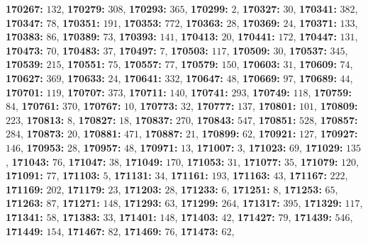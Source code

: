 \textsf{\bfseries 170267:} $132$, \textsf{\bfseries 170279:} $308$, \textsf{\bfseries 170293:} $365$, \textsf{\bfseries 170299:} $2$, \textsf{\bfseries 170327:} $30$, \textsf{\bfseries 170341:} $382$, \textsf{\bfseries 170347:} $78$, \textsf{\bfseries 170351:} $191$, \textsf{\bfseries 170353:} $772$, \textsf{\bfseries 170363:} $28$, \textsf{\bfseries 170369:} $24$, \textsf{\bfseries 170371:} $133$, \textsf{\bfseries 170383:} $86$, \textsf{\bfseries 170389:} $73$, \textsf{\bfseries 170393:} $141$, \textsf{\bfseries 170413:} $20$, \textsf{\bfseries 170441:} $172$, \textsf{\bfseries 170447:} $131$, \textsf{\bfseries 170473:} $70$, \textsf{\bfseries 170483:} $37$, \textsf{\bfseries 170497:} $7$, \textsf{\bfseries 170503:} $117$, \textsf{\bfseries 170509:} $30$, \textsf{\bfseries 170537:} $345$, \textsf{\bfseries 170539:} $215$, \textsf{\bfseries 170551:} $75$, \textsf{\bfseries 170557:} $77$, \textsf{\bfseries 170579:} $150$, \textsf{\bfseries 170603:} $31$, \textsf{\bfseries 170609:} $74$, \textsf{\bfseries 170627:} $369$, \textsf{\bfseries 170633:} $24$, \textsf{\bfseries 170641:} $332$, \textsf{\bfseries 170647:} $48$, \textsf{\bfseries 170669:} $97$, \textsf{\bfseries 170689:} $44$, \textsf{\bfseries 170701:} $119$, \textsf{\bfseries 170707:} $373$, \textsf{\bfseries 170711:} $140$, \textsf{\bfseries 170741:} $293$, \textsf{\bfseries 170749:} $118$, \textsf{\bfseries 170759:} $84$, \textsf{\bfseries 170761:} $370$, \textsf{\bfseries 170767:} $10$, \textsf{\bfseries 170773:} $32$, \textsf{\bfseries 170777:} $137$, \textsf{\bfseries 170801:} $101$, \textsf{\bfseries 170809:} $223$, \textsf{\bfseries 170813:} $8$, \textsf{\bfseries 170827:} $18$, \textsf{\bfseries 170837:} $270$, \textsf{\bfseries 170843:} $547$, \textsf{\bfseries 170851:} $528$, \textsf{\bfseries 170857:} $284$, \textsf{\bfseries 170873:} $20$, \textsf{\bfseries 170881:} $471$, \textsf{\bfseries 170887:} $21$, \textsf{\bfseries 170899:} $62$, \textsf{\bfseries 170921:} $127$, \textsf{\bfseries 170927:} $146$, \textsf{\bfseries 170953:} $28$, \textsf{\bfseries 170957:} $48$, \textsf{\bfseries 170971:} $13$, \textsf{\bfseries 171007:} $3$, \textsf{\bfseries 171023:} $69$, \textsf{\bfseries 171029:} $135$, \textsf{\bfseries 171043:} $76$, \textsf{\bfseries 171047:} $38$, \textsf{\bfseries 171049:} $170$, \textsf{\bfseries 171053:} $31$, \textsf{\bfseries 171077:} $35$, \textsf{\bfseries 171079:} $120$, \textsf{\bfseries 171091:} $77$, \textsf{\bfseries 171103:} $5$, \textsf{\bfseries 171131:} $34$, \textsf{\bfseries 171161:} $193$, \textsf{\bfseries 171163:} $43$, \textsf{\bfseries 171167:} $222$, \textsf{\bfseries 171169:} $202$, \textsf{\bfseries 171179:} $23$, \textsf{\bfseries 171203:} $28$, \textsf{\bfseries 171233:} $6$, \textsf{\bfseries 171251:} $8$, \textsf{\bfseries 171253:} $65$, \textsf{\bfseries 171263:} $87$, \textsf{\bfseries 171271:} $148$, \textsf{\bfseries 171293:} $63$, \textsf{\bfseries 171299:} $264$, \textsf{\bfseries 171317:} $395$, \textsf{\bfseries 171329:} $117$, \textsf{\bfseries 171341:} $58$, \textsf{\bfseries 171383:} $33$, \textsf{\bfseries 171401:} $148$, \textsf{\bfseries 171403:} $42$, \textsf{\bfseries 171427:} $79$, \textsf{\bfseries 171439:} $546$, \textsf{\bfseries 171449:} $154$, \textsf{\bfseries 171467:} $82$, \textsf{\bfseries 171469:} $76$, \textsf{\bfseries 171473:} $62$, 
